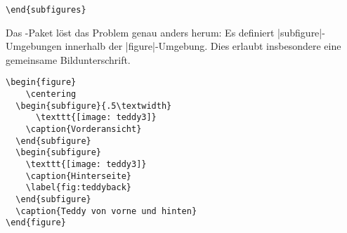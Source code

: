 \begin{enumerate}[label=\alph*)]
\begin{lstlisting}
\end{subfigures}
\end{lstlisting}


	Das -Paket löst das Problem genau anders herum: Es definiert |subfigure|-Umgebungen innerhalb der |figure|-Umgebung. Dies erlaubt insbesondere eine gemeinsame Bildunterschrift.
	
\begin{lstlisting}
\begin{figure}
	\centering
  \begin{subfigure}{.5\textwidth}
	  \texttt{[image: teddy3]}
    \caption{Vorderansicht}
  \end{subfigure}
  \begin{subfigure}
    \texttt{[image: teddy3]}
    \caption{Hinterseite}
    \label{fig:teddyback}
  \end{subfigure}
  \caption{Teddy von vorne und hinten}
\end{figure}
\end{lstlisting}
\end{enumerate}
